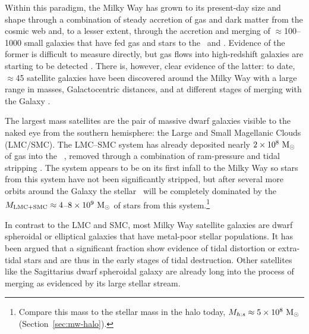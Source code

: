 Within this paradigm, the Milky Way has grown to its present-day size and shape
through a combination of steady accretion of gas and dark matter from the cosmic
web and, to a lesser extent, through the accretion and merging of $\approx$100--
1000 small galaxies that have fed gas and stars to the \mwdisk\ and \mwhalo.
Evidence of the former is difficult to measure directly, but gas flows into
high-redshift galaxies are starting to be detected \citep{martinc15}. There is,
however, clear evidence of the latter: to date, $\approx$45 satellite galaxies
have been discovered around the Milky Way with a large range in masses,
Galactocentric distances, and at different stages of merging with the Galaxy
\citep{belokurov07c, bechtol15}.

The largest mass satellites are the pair of massive dwarf galaxies visible to
the naked eye from the southern hemisphere: the Large and Small Magellanic
Clouds (LMC/SMC). The LMC--SMC system has already deposited nearly $2 \times
10^{8}~\mathrm{M}_\odot$ of gas into the \mwhalo\ \citep{putman03}, removed through a
combination of ram-pressure and tidal stripping \citep{salem15}. The system
appears to be on its first infall to the Milky Way \citep{besla10} so stars from
this system have not been significantly stripped, but after several more orbits
around the Galaxy the stellar \mwhalo\ will be completely dominated by the
$M_{\rm LMC+SMC} \approx 4$--$8 \times 10^{9}~\mathrm{M}_\odot$ \citep{jones94} of stars
from this system.\footnote{Compare this mass to the stellar mass in the halo
today, $M_{h:s} \approx 5 \times 10^8~\mathrm{M}_\odot$ (Section~\ref{sec:mw-halo}).}

In contrast to the LMC and SMC, most Milky Way satellite galaxies are dwarf
spheroidal or elliptical galaxies that have metal-poor stellar populations. It
has been argued that a significant fraction show evidence of tidal distortion or
extra-tidal stars \citep[e.g.,][]{belokurov07c, coleman07} and are thus in the
early stages of tidal destruction. Other satellites like the Sagittarius dwarf
spheroidal galaxy are already long into the process of merging as evidenced by
its large stellar stream.

